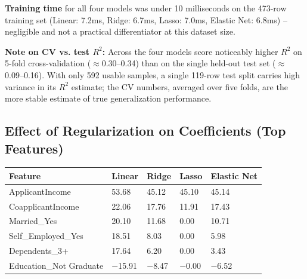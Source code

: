 \documentclass[12pt,a4paper]{article}
\begin{document}
\textbf{Training time} for all four models was under 10 milliseconds on the 473-row training
set (Linear: 7.2ms, Ridge: 6.7ms, Lasso: 7.0ms, Elastic Net: 6.8ms) -- negligible and not a
practical differentiator at this dataset size.

\textbf{Note on CV vs. test $R^2$:} Across the four models score noticeably higher $R^2$ on
5-fold cross-validation ($\approx$0.30--0.34) than on the single held-out test set
($\approx$0.09--0.16). With only 592 usable samples, a single 119-row test split carries
high variance in its $R^2$ estimate; the CV numbers, averaged over five folds, are the more
stable estimate of true generalization performance.

\subsection*{Effect of Regularization on Coefficients (Top Features)}
\begin{longtable}{|p{4.2cm}|p{2.3cm}|p{2.1cm}|p{2.1cm}|p{2.3cm}|}
\hline
\textbf{Feature} & \textbf{Linear} & \textbf{Ridge} & \textbf{Lasso} & \textbf{Elastic Net} \\ \hline
\endhead
ApplicantIncome & 53.68 & 45.12 & 45.10 & 45.14 \\ \hline
CoapplicantIncome & 22.06 & 17.76 & 11.91 & 17.43 \\ \hline
Married\_Yes & 20.10 & 11.68 & 0.00 & 10.71 \\ \hline
Self\_Employed\_Yes & 18.51 & 8.03 & 0.00 & 5.98 \\ \hline
Dependents\_3+ & 17.64 & 6.20 & 0.00 & 3.43 \\ \hline
Education\_Not Graduate & $-$15.91 & $-$8.47 & $-$0.00 & $-$6.52 \\ \hline
\end{longtable}
\end{document}
